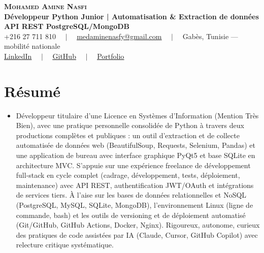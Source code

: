 \documentclass[letterpaper,9pt]{article}
\begin{document}
\begin{center}
    \textbf{\Huge \scshape \color{navy} Mohamed Amine Nasfi} \\[3pt]
    \small \textbf{\color{accent} Développeur Python Junior | Automatisation \& Extraction de données \textperiodcentered{} API REST \textperiodcentered{} PostgreSQL/MongoDB} \\[3pt]
    \footnotesize \color{greytext}
    +216 27 711 810 $\quad|\quad$
    \href{mailto:medaminenasfy@gmail.com}{\underline{medaminenasfy@gmail.com}} $\quad|\quad$
    Gabès, Tunisie — mobilité nationale \\[2pt]
    \href{https://www.linkedin.com/in/mohamed-amine-nasfi/}{\underline{LinkedIn}} $\quad|\quad$ \href{https://github.com/medaminenasfi}{\underline{GitHub}} $\quad|\quad$ \href{https://mohamedamine-portfolio.onrender.com}{\underline{Portfolio}}
\end{center}
\vspace{-5pt}

\section{Résumé}
\begin{itemize}[leftmargin=0.18in, label={}, itemsep=1.2pt, topsep=1.5pt, parsep=0pt]
\item \footnotesize{Développeur titulaire d'une Licence en Systèmes d'Information (Mention Très Bien), avec une pratique personnelle consolidée de Python à travers deux productions complètes et publiques : un outil d'extraction et de collecte automatisée de données web (BeautifulSoup, Requests, Selenium, Pandas) et une application de bureau avec interface graphique PyQt5 et base SQLite en architecture MVC. S'appuie sur une expérience freelance de développement full-stack en cycle complet (cadrage, développement, tests, déploiement, maintenance) avec API REST, authentification JWT/OAuth et intégrations de services tiers. À l'aise sur les bases de données relationnelles et NoSQL (PostgreSQL, MySQL, SQLite, MongoDB), l'environnement Linux (ligne de commande, bash) et les outils de versioning et de déploiement automatisé (Git/GitHub, GitHub Actions, Docker, Nginx). Rigoureux, autonome, curieux des pratiques de code assistées par IA (Claude, Cursor, GitHub Copilot) avec relecture critique systématique.}
\end{itemize}\vspace{-3pt}

\end{document}
